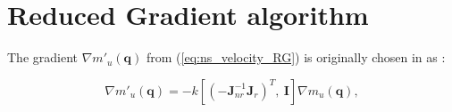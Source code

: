 %













 





	
	






 



\section{Reduced Gradient algorithm}
\label{sec:1D2D}


The gradient $\nabla m'_u(\mathbf{q})$  from (\ref{eq:ns_velocity_RG}) is originally  chosen in \cite{reduced_gradient} as : 

\begin{equation}
 \nabla m'_u(\mathbf{q}) = - k \left[(-\mathbf{J}_{nr}^{-1} \mathbf{J}_r)^{T}, \   \mathbf{I} \right ] \nabla m_u(\mathbf{q})
 ,
\label{eq:RG_deLuca}
\end{equation}






